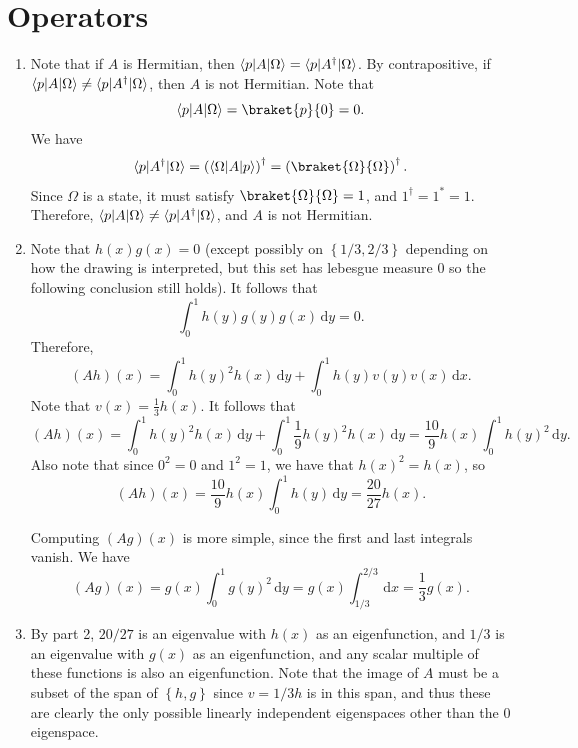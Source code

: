 \documentclass[11pt, letterpaper]{article}
\begin{document}
\section{Operators}
\begin{enumerate}
	\item Note that if $A$ is Hermitian, then $\langle p\rvert A\lvert\Omega \rangle =\langle p\rvert A^{\dagger} \lvert\Omega \rangle $. By contrapositive, if $\langle p\rvert A\lvert\Omega \rangle \neq \langle p\rvert A^{\dagger} \lvert\Omega \rangle $, then $A$ is not Hermitian. Note that
		\[
			\bra{p} A\ket{\Omega } =\braket{p}{0} =0
		.\]
		We have
		\[
			\bra{p} A^{\dagger} \ket{\Omega } =\left( \bra{\Omega } A\ket{p}  \right) ^{\dagger} =\left( \braket{\Omega }{\Omega }  \right) ^{\dagger} 
		.\]
		Since $\Omega $ is a state, it must satisfy $\braket{\Omega }{\Omega } =1$, and $1^{\dagger} =1^*=1$. Therefore, $\langle p\rvert A\lvert\Omega \rangle \neq \langle p\rvert A^{\dagger} \lvert\Omega \rangle $, and $A$ is not Hermitian.
	\item Note that $h(x)g(x)=0$ (except possibly on $\left\{ 1/3,2/3 \right\} $ depending on how the drawing is interpreted, but this set has lebesgue measure 0 so the following conclusion still holds). It follows that
		\[
			\int_{0}^{1} h(y)g(y)g(x) \,\mathrm{d} y=0
		.\]
		Therefore,
		\[
			(Ah)(x)=\int_{0}^{1} h(y)^2h(x) \,\mathrm{d} y+\int_{0}^{1} h(y)v(y)v(x) \,\mathrm{d} x
		.\]
		Note that $v(x)=\frac{1}{3} h(x)$. It follows that
		\[
			(Ah)(x)=\int_{0}^{1} h(y)^2h(x) \,\mathrm{d} y+\int_{0}^{1} \frac{1}{9} h(y)^2 h(x)\,\mathrm{d} y=\frac{10}{9} h(x)\int_{0}^{1} h(y)^2 \,\mathrm{d} y
		.\]
		Also note that since $0^2=0$ and $1^2=1$, we have that $h(x)^2=h(x)$, so
		\[
			(Ah)(x)=\frac{10}{9} h(x)\int_{0}^{1} h(y) \,\mathrm{d} y=\frac{20}{27} h(x) 
		.\]

		Computing $(Ag)(x)$ is more simple, since the first and last integrals vanish. We have
		\[
			(Ag)(x)=g(x)\int_{0}^{1} g(y)^2 \,\mathrm{d} y=g(x)\int_{1/3}^{2/3}  \,\mathrm{d} x=\frac{1}{3} g(x)
		.\]
	\item By part 2, $20/27$ is an eigenvalue with $h(x)$ as an eigenfunction, and $1/3$ is an eigenvalue with $g(x)$ as an eigenfunction, and any scalar multiple of these functions is also an eigenfunction. Note that the image of $A$ must be a subset of the span of $\left\{ h,g \right\} $ since $v=1/3h$ is in this span, and thus these are clearly the only possible linearly independent eigenspaces other than the 0 eigenspace.
\end{enumerate}
\end{document}
